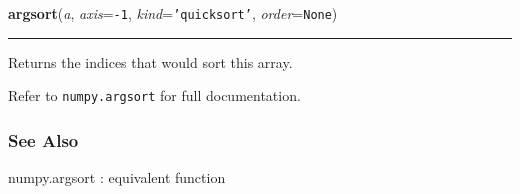     \begin{boxedminipage}{\textwidth}

    \raggedright \textbf{argsort}(\textit{a}, \textit{axis}=\texttt{-1}, \textit{kind}=\texttt{'quicksort'}, \textit{order}=\texttt{None})

    \vspace{-1.5ex}

    \rule{\textwidth}{0.5\fboxrule}

Returns the indices that would sort this array.

Refer to \texttt{numpy.argsort} for full documentation.



\hypertarget{see-also}{}
\subsubsection*{See Also}

numpy.argsort : equivalent function
    \vspace{1ex}

    \end{boxedminipage}

    \label{numpy:ndarray:astype}

    \vspace{0.5ex}

